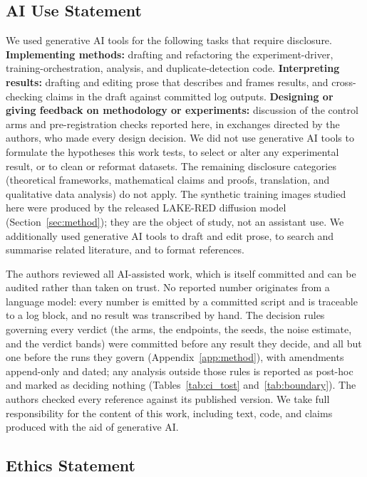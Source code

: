 \documentclass{article}
\newif\ifrevmarked \revmarkedtrue
\DeclareRobustCommand{\revB}[1]{\ifrevmarked{\color{RevB}#1}\else{#1}\fi}
\begin{document}
\subsection*{AI Use Statement}
We used generative AI tools for the following tasks that require disclosure. \textbf{Implementing
methods:} drafting and refactoring the experiment-driver, training-orchestration, analysis, and
duplicate-detection code. \textbf{Interpreting results:} drafting and editing prose that describes
and frames results, and cross-checking claims in the draft against committed log outputs.
\textbf{Designing or giving feedback on methodology or experiments:} discussion of the control arms
and pre-registration checks reported here, in exchanges directed by the authors, who made every
design decision. We did not use generative AI tools to formulate the hypotheses this work tests, to
select or alter any experimental result, or to clean or reformat datasets. The remaining disclosure
categories (theoretical frameworks, mathematical claims and proofs, translation, and qualitative
data analysis) do not apply. The synthetic training images studied here were produced by the
released LAKE-RED diffusion model (Section~\ref{sec:method}); they are the object of study, not an
assistant use. We additionally used generative AI tools to draft and edit prose, to search and
summarise related literature, and to format references.

The authors reviewed all AI-assisted work, which is itself committed and can be audited rather than
taken on trust. No reported number originates from a language model: every number is emitted by a
committed script and is traceable to a log block, and no result was transcribed by hand. The
decision rules governing every verdict (the arms, the endpoints, the seeds, the noise estimate,
and the verdict bands) were \revB{committed before any result they decide, and all but one before the runs they govern}
(Appendix~\ref{app:method}), with amendments append-only and dated; any analysis outside those rules
is reported as post-hoc and marked as deciding nothing (Tables~\ref{tab:ci_tost}
and~\ref{tab:boundary}). The authors checked every reference against its published version. We take
full responsibility for the content of this work, including text, code, and claims produced with the
aid of generative AI.

\subsection*{Ethics Statement}
\end{document}

